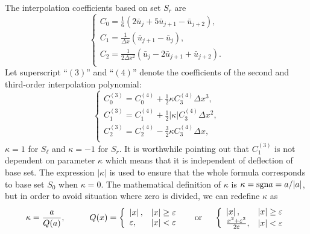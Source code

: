 \documentclass[]{article}
\def\sgn{\hbox{\rm sgn}}
\def\abs#1{\left|#1\right|}
\begin{document}
The interpolation coefficients based on set $S_r$ are
\begin{equation*}
\left\{\begin{array}{l}
\displaystyle
C_0 = \frac{1}{6}(2\bar u_{j}+5\bar u_{j+1}-\bar u_{j+2}),\\[3mm]
\displaystyle
C_1= \frac{1}{\Delta x}(\bar u_{j+1}-\bar u_{j}),\\[3mm]
\displaystyle
C_2 = \frac{1}{2\Delta x^2}(\bar u_{j}-2\bar u_{j+1}+\bar u_{j+2}).\\[3mm]
\end{array}\right.
\end{equation*}
Let superscript ``$(3)$'' and ``$(4)$'' denote the coefficients of the second
and third-order interpolation polynomial:
\begin{equation}
\left\{\begin{array}{l}
\displaystyle
C_0^{(3)}=C_0^{(4)}+\frac{1}{2}\kappa C_3^{(4)}\Delta x^3, \\[3mm]
\displaystyle
C_1^{(3)}=C_1^{(4)}+\frac{1}{2}\abs{\kappa} C_3^{(4)}\Delta x^2, \\[3mm]
\displaystyle
C_2^{(3)}=C_2^{(4)}-\frac{3}{2}\kappa C_3^{(4)}\Delta x, \\
\end{array}\right.
\label{eq:ave-C-34}
\end{equation}
$\kappa = 1$ for $S_\ell$ and $\kappa = -1$ for $S_r$. It is worthwhile pointing
out that $C_1^{(3)}$ is not dependent on parameter $\kappa$ which means that it
is independent of deflection of base set. The expression $|\kappa|$ is used to
ensure that the whole formula corresponds to base set $S_0$ when $\kappa=0$. The
mathematical definition of $\kappa$ is $\kappa = \sgn a = a/|a|$, but
in order to avoid situation where zero is divided, we can redefine $\kappa$ as
\begin{equation*}
\kappa =\frac{a}{Q(a)},\hspace{1cm}Q(x) = \left\{\begin{array}{ll} \abs{x}, & \abs{x}\ge \varepsilon \\
\varepsilon, & \abs{x} < \varepsilon \\
\end{array}\right.\hspace{5mm}\mbox{or}\hspace{5mm}
\left\{\begin{array}{ll} \abs{x}, & \abs{x}\ge \varepsilon \\
\frac{x^2+\varepsilon^2}{2\varepsilon}, & \abs{x} < \varepsilon \\ \end{array}\right.
\end{equation*}
\end{document}
